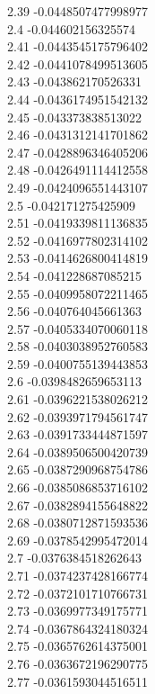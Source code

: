 {2.39	-0.0448507477998977\\
2.4	-0.044602156325574\\
2.41	-0.0443545175796402\\
2.42	-0.0441078499513605\\
2.43	-0.043862170526331\\
2.44	-0.0436174951542132\\
2.45	-0.043373838513022\\
2.46	-0.0431312141701862\\
2.47	-0.0428896346405206\\
2.48	-0.0426491114412558\\
2.49	-0.0424096551443107\\
2.5	-0.042171275425909\\
2.51	-0.0419339811136835\\
2.52	-0.0416977802314102\\
2.53	-0.0414626800414819\\
2.54	-0.041228687085215\\
2.55	-0.0409958072211465\\
2.56	-0.040764045661363\\
2.57	-0.0405334070060118\\
2.58	-0.0403038952760583\\
2.59	-0.0400755139443853\\
2.6	-0.0398482659653113\\
2.61	-0.0396221538026212\\
2.62	-0.0393971794561747\\
2.63	-0.0391733444871597\\
2.64	-0.0389506500420739\\
2.65	-0.0387290968754786\\
2.66	-0.0385086853716102\\
2.67	-0.0382894155648822\\
2.68	-0.0380712871593536\\
2.69	-0.0378542995472014\\
2.7	-0.0376384518262643\\
2.71	-0.0374237428166774\\
2.72	-0.0372101710766731\\
2.73	-0.0369977349175771\\
2.74	-0.0367864324180324\\
2.75	-0.0365762614375001\\
2.76	-0.0363672196290775\\
2.77	-0.0361593044516511\\
}
